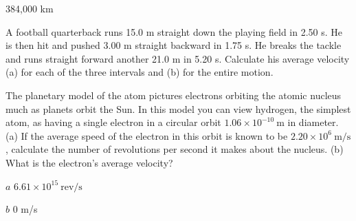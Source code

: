 \documentclass[
]{book}
\newenvironment{problems-exercises}{}{}
\begin{document}
\begin{problems-exercises}
\leavevmode\hypertarget{fs-id1659453}{}%
384,000 km

\hypertarget{fs-id2577314}{}
\leavevmode\hypertarget{fs-id4044402}{}%
A football quarterback runs 15.0 m straight down the playing field in
2.50 s. He is then hit and pushed 3.00 m straight backward in 1.75 s. He
breaks the tackle and runs straight forward another 21.0 m in 5.20 s.
Calculate his average velocity (a) for each of the three intervals and
(b) for the entire motion.

\hypertarget{fs-id4047255}{}
\leavevmode\hypertarget{fs-id4047256}{}%
The planetary model of the atom pictures electrons orbiting the atomic
nucleus much as planets orbit the Sun. In this model you can view
hydrogen, the simplest atom, as having a single electron in a circular
orbit \(1\text{.}\text{06} \times \text{10}^{- \text{10}}\ \text{m}\) in
diameter. (a) If the average speed of the electron in this orbit is
known to be \(2\text{.}{\text{20} \times \text{10}^{6}}\ \text{m/s}\),
calculate the number of revolutions per second it makes about the
nucleus. (b) What is the electron's average velocity?

\leavevmode\hypertarget{fs-id2580487}{}%
\(a\)
\({6\text{.}{\text{61} \times \text{10}^{\text{15}}}\ \text{rev/s}}{}\)

\(b\) 0 m/s

\end{problems-exercises}
\end{document}
